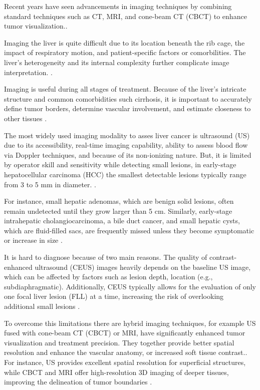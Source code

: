 \documentclass[11pt]{article} %
\begin{document}
\begin{multicols}{2}

Recent years have seen advancements in imaging techniques by combining standard techniques such as CT, MRI, and cone-beam CT (CBCT) to enhance tumor visualization.\cite{floridi2022}.

Imaging the liver is quite difficult due to its location beneath the rib cage, the impact of respiratory motion, and patient-specific factors or comorbilities. The liver’s heterogeneity and its internal complexity further complicate image interpretation. \cite{ferraioli2018}.

Imaging is useful during all stages of treatment. Because of the liver's intricate structure and common comorbidities such cirrhosis, it is important to accurately define tumor borders, determine vascular involvement, and estimate closeness to other tissues \cite{floridi2022}.

The most widely used imaging modality to asses liver cancer is ultrasound (US) due to its accessibility, real-time imaging capability, ability to assess blood flow via Doppler techniques, and because of its non-ionizing nature. But, it is limited by operator skill and sensitivity while detecting small lesions, in early-stage hepatocellular carcinoma (HCC) the smallest detectable lesions typically range from 3 to 5 mm in diameter. \cite{mcmahon2023,ferraioli2018}. 

 For instance, small hepatic adenomas, which are benign solid lesions, often remain undetected until they grow larger than 5 cm. Similarly, early-stage intrahepatic cholangiocarcinoma, a bile duct cancer, and small hepatic cysts, which are fluid-filled sacs, are frequently missed unless they become symptomatic or increase in size \cite{tre777}. 
 
 It is hard to diagnose because of two main reasons. The quality of contrast-enhanced ultrasound (CEUS) images heavily depends on the baseline US image, which can be affected by factors such as lesion depth, location (e.g., subdiaphragmatic). Additionally, CEUS typically allows for the evaluation of only one focal liver lesion (FLL) at a time, increasing the risk of overlooking additional small lesions \cite{pmc5588445}.

To overcome this limitations there are hybrid imaging techniques, for example US fused with cone-beam CT (CBCT) or MRI, have significantly enhanced tumor visualization and treatment precision. They together provide better spatial resolution and enhance the vascular anatomy, or increased soft tissue contrast.\cite{floridi2022}.  For instance, US provides excellent spatial resolution for superficial structures, while CBCT and MRI offer high-resolution 3D imaging of deeper tissues, improving the delineation of tumor boundaries \cite{pmc3016679}.


\end{multicols}
\end{document}
